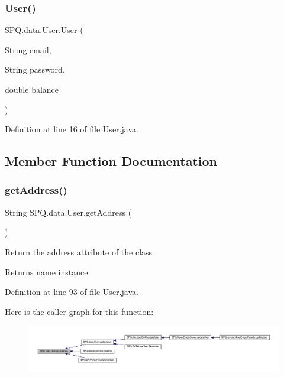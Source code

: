 \subsubsection{\texorpdfstring{User()}{User()}\hspace{0.1cm}{\footnotesize\ttfamily [5/5]}}
{\footnotesize\ttfamily S\+P\+Q.\+data.\+User.\+User (\begin{DoxyParamCaption}\item[{String}]{email,  }\item[{String}]{password,  }\item[{double}]{balance }\end{DoxyParamCaption})}



Definition at line 16 of file User.\+java.



\subsection{Member Function Documentation}
\mbox{\label{class_s_p_q_1_1data_1_1_user_a47d0065ad917d39d23acd62835575179}} 
\subsubsection{\texorpdfstring{get\+Address()}{getAddress()}}
{\footnotesize\ttfamily String S\+P\+Q.\+data.\+User.\+get\+Address (\begin{DoxyParamCaption}{ }\end{DoxyParamCaption})}

Return the address attribute of the class \begin{DoxyReturn}{Returns}
name instance 
\end{DoxyReturn}


Definition at line 93 of file User.\+java.

Here is the caller graph for this function\+:\nopagebreak
\begin{figure}[H]
\begin{center}
\leavevmode
\includegraphics[width=350pt]{class_s_p_q_1_1data_1_1_user_a47d0065ad917d39d23acd62835575179_icgraph}
\end{center}
\end{figure}
\mbox{\label{class_s_p_q_1_1data_1_1_user_a03cc880edbf4758b44318af1587824e5}} 

